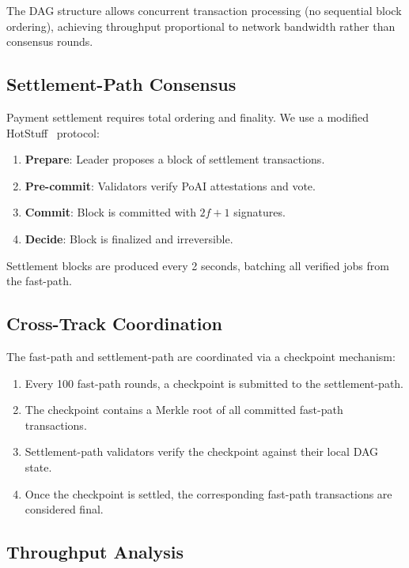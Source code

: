 The DAG structure allows concurrent transaction processing (no sequential block ordering), achieving throughput proportional to network bandwidth rather than consensus rounds.

\subsection{Settlement-Path Consensus}

Payment settlement requires total ordering and finality. We use a modified HotStuff~\cite{yin2019hotstuff} protocol:

\begin{enumerate}[leftmargin=1.4em]
    \item \textbf{Prepare}: Leader proposes a block of settlement transactions.
    \item \textbf{Pre-commit}: Validators verify PoAI attestations and vote.
    \item \textbf{Commit}: Block is committed with $2f+1$ signatures.
    \item \textbf{Decide}: Block is finalized and irreversible.
\end{enumerate}

Settlement blocks are produced every 2 seconds, batching all verified jobs from the fast-path.

\subsection{Cross-Track Coordination}

The fast-path and settlement-path are coordinated via a checkpoint mechanism:

\begin{enumerate}[leftmargin=1.4em]
    \item Every 100 fast-path rounds, a checkpoint is submitted to the settlement-path.
    \item The checkpoint contains a Merkle root of all committed fast-path transactions.
    \item Settlement-path validators verify the checkpoint against their local DAG state.
    \item Once the checkpoint is settled, the corresponding fast-path transactions are considered final.
\end{enumerate}

\subsection{Throughput Analysis}

